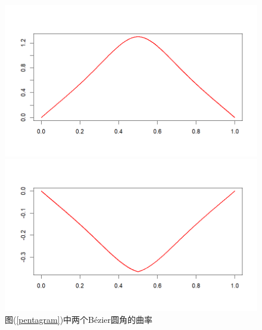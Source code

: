 \documentclass[utf8]{ctexart} %
\begin{document}
\begin{figure}
	\centering
	\begin{minipage}{0.49\linewidth}
		\centering
		\includegraphics[width=0.7\linewidth]{figures/Pentagram_Bezier1.png}
	\end{minipage}
	\begin{minipage}{0.49\linewidth}
		\centering
		\includegraphics[width=0.7\linewidth]{figures/Pentagram_Bezier2.png}
	\end{minipage}
\caption{\small{图(\ref{pentagram})中两个B\'ezier圆角的曲率}}
\end{figure}
\end{document}
